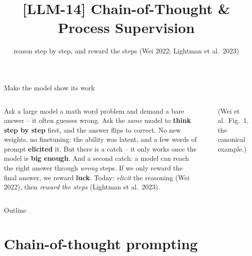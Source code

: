 \documentclass[aspectratio=169]{beamer}
\title{[LLM-14] Chain-of-Thought \& Process Supervision}
\subtitle{reason step by step, and reward the steps \quad(Wei 2022; Lightman et al.\ 2023)}
\date{}
\begin{document}
\begin{frame}{Make the model show its work}
  \begin{columns}[T]
    Ask a large model a math word problem and demand a bare answer -- it often
    guesses wrong. Ask the \emph{same} model to \textbf{think step by step} first,
    and the answer flips to correct.
    \vskip 6pt
    No new weights, no finetuning: the ability was latent, and a few words of
    prompt \textbf{elicited} it. But there is a catch -- it only works once the
    model is \textbf{big enough}.
    \vskip 6pt
    And a second catch: a model can reach the right answer through \emph{wrong}
    steps. If we only reward the final answer, we reward \textbf{luck}.
    \vskip 6pt
    Today: \emph{elicit} the reasoning (Wei 2022), then \emph{reward the steps}
    (Lightman et al.\ 2023).
    \begin{center}
    \end{center}
    \vskip 4pt
    \footnotesize \centering (Wei et al.\ Fig.\ 1, the canonical example.)
  \end{columns}
\end{frame}

\begin{frame}{Outline}
  \tableofcontents
\end{frame}

\section{Chain-of-thought prompting}
\end{document}

